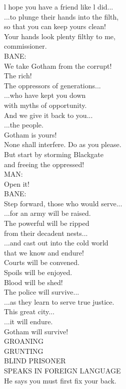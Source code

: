 \documentclass{article}
\begin{document}
\begin{multicols}{3}
l hope you have a friend like l did...\\
...to plunge their hands into the filth,\\
so that you can keep yours clean!\\
Your hands look plenty filthy to me,\\
commissioner.\\
BANE:\\
We take Gotham from the corrupt!\\
The rich!\\
The oppressors of generations...\\
...who have kept you down\\
with myths of opportunity.\\
And we give it back to you...\\
...the people.\\
Gotham is yours!\\
None shall interfere. Do as you please.\\
But start by storming Blackgate\\
and freeing the oppressed!\\
MAN:\\
Open it!\\
BANE:\\
Step forward, those who would serve...\\
...for an army will be raised.\\
The powerful will be ripped\\
from their decadent nests...\\
...and cast out into the cold world\\
that we know and endure!\\
Courts will be convened.\\
Spoils will be enjoyed.\\
Blood will be shed!\\
The police will survive...\\
...as they learn to serve true justice.\\
This great city...\\
...it will endure.\\
Gotham will survive!\\
GROANING\\
GRUNTING\\
BLIND PRISONER\\
SPEAKS IN FOREIGN LANGUAGE\\
He says you must first fix your back.\\

\end{multicols}
\end{document}
